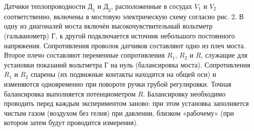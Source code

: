 \documentclass[a4paper,12pt]{article}
\theoremstyle{plain} %
\theoremstyle{definition} %
\theoremstyle{remark} %
\begin{document}
Датчики теплопроводности $\text{Д}_1$ и $\text{Д}_2$, расположенные в сосудах $V_1$ и $V_2$ соответственно, включены в мостовую электрическую схему согласно рис. 2. В одну из диагоналей моста включён высокочувствительный вольтметр (гальванометр) $\text{Г}$, к другой подключается источник небольшого постоянного напряжения. Сопротивления проволок датчиков составляют одно из плеч моста. Второе плечо составляют переменные сопротивления $R_1$, $R_2$ и $R$, служащие для установки показаний вольтметра $\text{Г}$ на нуль (балансировка моста). Сопротивления $R_1$ и $R_2$ спарены (их подвижные контакты находятся на общей оси) и изменяются одновременно при повороте ручки грубой регулировки. Точная балансировка выполняется потенциометром $R$. Балансировку необходимо проводить перед каждым экспериментом заново: при этом установка заполняется чистым газом (воздухом без гелия) при давлении, близком «рабочему» (при котором затем будут проводится измерения).
\end{document}
